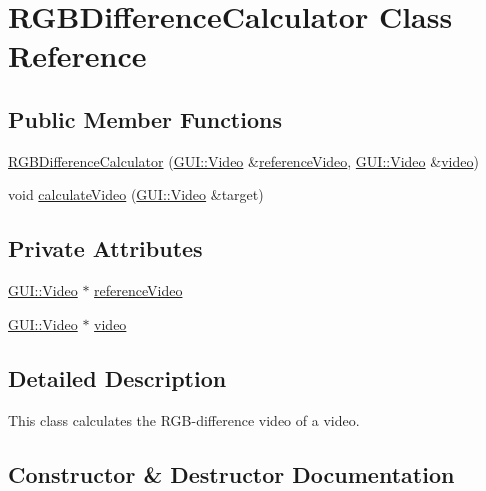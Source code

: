 \hypertarget{classUtility_1_1RGBDifferenceCalculator}{}\section{R\+G\+B\+Difference\+Calculator Class Reference}
\label{classUtility_1_1RGBDifferenceCalculator}
\subsection*{Public Member Functions}
\begin{DoxyCompactItemize}
\item 
\hyperlink{classUtility_1_1RGBDifferenceCalculator_a7c68bcd9ed5443344f8a494b10b9f2a7}{R\+G\+B\+Difference\+Calculator} (\hyperlink{classGUI_1_1Video}{G\+U\+I\+::\+Video} \&\hyperlink{classUtility_1_1RGBDifferenceCalculator_af425436e2aa13b78a247a98a264cfd8d}{reference\+Video}, \hyperlink{classGUI_1_1Video}{G\+U\+I\+::\+Video} \&\hyperlink{classUtility_1_1RGBDifferenceCalculator_a1c4d4daa00ecea5e8390244e057da0df}{video})
\item 
void \hyperlink{classUtility_1_1RGBDifferenceCalculator_a4adae70cc28879677dd5a47e6e5f6210}{calculate\+Video} (\hyperlink{classGUI_1_1Video}{G\+U\+I\+::\+Video} \&target)
\end{DoxyCompactItemize}
\subsection*{Private Attributes}
\begin{DoxyCompactItemize}
\item 
\hyperlink{classGUI_1_1Video}{G\+U\+I\+::\+Video} $\ast$ \hyperlink{classUtility_1_1RGBDifferenceCalculator_af425436e2aa13b78a247a98a264cfd8d}{reference\+Video}
\item 
\hyperlink{classGUI_1_1Video}{G\+U\+I\+::\+Video} $\ast$ \hyperlink{classUtility_1_1RGBDifferenceCalculator_a1c4d4daa00ecea5e8390244e057da0df}{video}
\end{DoxyCompactItemize}


\subsection{Detailed Description}
This class calculates the R\+G\+B-\/difference video of a video. 

\subsection{Constructor \& Destructor Documentation}
\hypertarget{classUtility_1_1RGBDifferenceCalculator_a7c68bcd9ed5443344f8a494b10b9f2a7}{}
